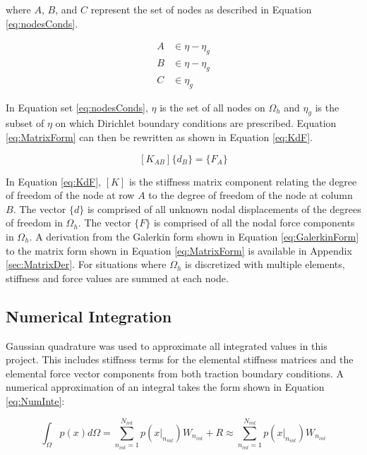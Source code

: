 \documentclass[a4paper, 12pt]{article}
\begin{document}
\noindent 
where $A$, $B$, and $C$ represent the set of nodes as described in 
Equation \ref{eq:nodesConds}.

\begin{align}
A &\in \eta - \eta_g
  \nonumber         \\
B &\in \eta - \eta_g
  \nonumber         \\
C &\in \eta_g
  \label{eq:nodesConds}
\end{align}

\noindent
In Equation set \ref{eq:nodesConds}, $\eta$ is the set of all nodes on $\Omega_h$ 
and $\eta_g$ is the subset of $\eta$ on which Dirichlet boundary conditions are 
prescribed. Equation \ref{eq:MatrixForm} can then be rewritten as shown in
Equation \ref{eq:KdF}.

\begin{equation} \label{eq:KdF}
[ K_{AB} ] \{ d_B \} = \{ F_A \} 
\end{equation}

\noindent
In Equation \ref{eq:KdF}, $[K]$ is the stiffness matrix component 
relating the degree of freedom of the node at row $A$ to the degree of freedom 
of the node at column $B$. The vector $\{d\}$ is comprised of all unknown 
nodal displacements of the degrees of freedom in $\Omega_h$. The 
vector $\{F\}$ is comprised of all the nodal force components in $\Omega_h$.
A derivation from the Galerkin form shown in Equation \ref{eq:GalerkinForm}
to the matrix form shown in Equation \ref{eq:MatrixForm} is available in Appendix
\ref{sec:MatrixDer}. For situations where $\Omega_h$ is discretized with 
multiple elements, stiffness and force values are summed at each node.

\subsection{Numerical Integration} \label{subsec:numInt}
Gaussian quadrature was used to approximate all integrated 
values in this project. This includes stiffness terms
for the elemental stiffness matrices and the elemental force vector components
from both traction boundary conditions. 
A numerical approximation of an integral takes the form shown in 
Equation \ref{eq:NumInte}:

\begin{equation} \label{eq:NumInte}
\int_{\Omega} p(x) d\Omega 
  = \sum_{n_{int}=1}^{N_{int}} p(x\Big|_{n_{int}}) W_{n_{int}} + R 
  \approx \sum_{n_{int}=1}^{N_{int}} p(x\Big|_{n_{int}}) W_{n_{int}}
\end{equation}
\end{document}
